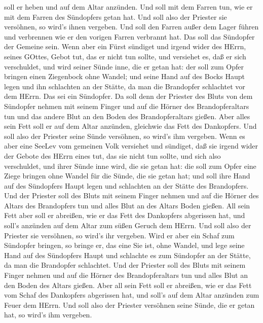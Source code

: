 soll er heben und auf dem Altar anzünden.  Und soll mit dem
Farren tun, wie er mit dem Farren des Sündopfers getan hat. Und soll
also der Priester sie versöhnen, so wird's ihnen vergeben. 
Und soll den Farren außer dem Lager führen und verbrennen wie er den
vorigen Farren verbrannt hat. Das soll das Sündopfer der Gemeine sein.
 Wenn aber ein Fürst sündiget und irgend wider des HErrn,
seines GOttes, Gebot tut, das er nicht tun sollte, und versiehet es, daß
er sich verschuldet,  und wird seiner Sünde inne, die er
getan hat: der soll zum Opfer bringen einen Ziegenbock ohne Wandel;
 und seine Hand auf des Bocks Haupt legen und ihn
schlachten an der Stätte, da man die Brandopfer schlachtet vor dem
HErrn. Das sei ein Sündopfer.  Da soll denn der Priester
des Bluts von dem Sündopfer nehmen mit seinem Finger und auf die Hörner
des Brandopferaltars tun und das andere Blut an den Boden des
Brandopferaltars gießen.  Aber alles sein Fett soll er auf
dem Altar anzünden, gleichwie das Fett des Dankopfers. Und soll also der
Priester seine Sünde versöhnen, so wird's ihm vergeben. 
Wenn es aber eine SeeLev vom gemeinen Volk versiehet und sündiget, daß
sie irgend wider der Gebote des HErrn eines tut, das sie nicht tun
sollte, und sich also verschuldet,  und ihrer Sünde inne
wird, die sie getan hat: die soll zum Opfer eine Ziege bringen ohne
Wandel für die Sünde, die sie getan hat;  und soll ihre
Hand auf des Sündopfers Haupt legen und schlachten an der Stätte des
Brandopfers.  Und der Priester soll des Bluts mit seinem
Finger nehmen und auf die Hörner des Altars des Brandopfers tun und
alles Blut an des Altars Boden gießen.  All sein Fett aber
soll er abreißen, wie er das Fett des Dankopfers abgerissen hat, und
soll's anzünden auf dem Altar zum süßen Geruch dem HErrn. Und soll also
der Priester sie versöhnen, so wird's ihr vergeben.  Wird
er aber ein Schaf zum Sündopfer bringen, so bringe er, das eine Sie ist,
ohne Wandel,  und lege seine Hand auf des Sündopfers Haupt
und schlachte es zum Sündopfer an der Stätte, da man die Brandopfer
schlachtet.  Und der Priester soll des Bluts mit seinem
Finger nehmen und auf die Hörner des Brandopferaltars tun und alles Blut
an den Boden des Altars gießen.  Aber all sein Fett soll er
abreißen, wie er das Fett vom Schaf des Dankopfers abgerissen hat, und
soll's auf dem Altar anzünden zum Feuer dem HErrn. Und soll also der
Priester versöhnen seine Sünde, die er getan hat, so wird's ihm
vergeben.

